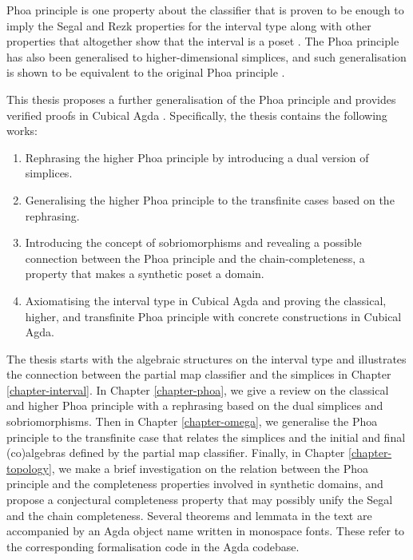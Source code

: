 Phoa principle is one property about the classifier \cite{phoa_domain_1991} that is proven to be enough to imply the Segal and Rezk properties for the interval type along with other properties that altogether show that the interval is a poset \cite{sterling_domains_2025}. The Phoa principle has also been generalised to higher-dimensional simplices, and such generalisation is shown to be equivalent to the original Phoa principle \cite{pugh_when_2025}.

This thesis proposes a further generalisation of the Phoa principle and provides verified proofs in Cubical Agda \cite{vezzosi_cubical_2019}. Specifically, the thesis contains the following works:
\begin{enumerate}
    \item Rephrasing the higher Phoa principle by introducing a dual version of simplices.
    \item Generalising the higher Phoa principle to the transfinite cases based on the rephrasing.
    \item Introducing the concept of sobriomorphisms and revealing a possible connection between the Phoa principle and the chain-completeness, a property that makes a synthetic poset a domain.
    \item Axiomatising the interval type in Cubical Agda and proving the classical, higher, and transfinite Phoa principle with concrete constructions in Cubical Agda.
\end{enumerate}

The thesis starts with the algebraic structures on the interval type and illustrates the connection between the partial map classifier and the simplices in Chapter \ref{chapter-interval}. In Chapter \ref{chapter-phoa}, we give a review on the classical and higher Phoa principle with a rephrasing based on the dual simplices and sobriomorphisms. Then in Chapter \ref{chapter-omega}, we generalise the Phoa principle to the transfinite case that relates the simplices and the initial and final (co)algebras defined by the partial map classifier. Finally, in Chapter \ref{chapter-topology}, we make a brief investigation on the relation between the Phoa principle and the completeness properties involved in synthetic domains, and propose a conjectural completeness property that may possibly unify the Segal and the chain completeness. Several theorems and lemmata in the text are accompanied by an Agda object name written in monospace fonts. These refer to the corresponding formalisation code in the Agda codebase.
